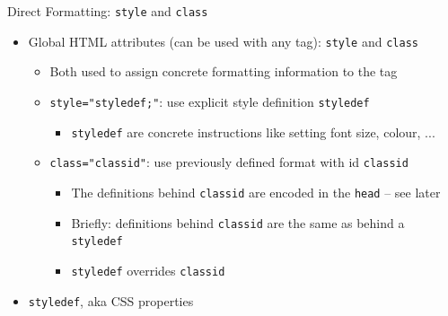 
\begin{frame}[fragile]{Direct Formatting: \texttt{style} and \texttt{class}}
%
\begin{itemize}
\item Global HTML attributes (can be used with any tag): \texttt{style} and \texttt{class}
	\begin{itemize}
	\item Both used to assign concrete formatting information to the tag
	\item \texttt{style="styledef;"}: use explicit style definition \texttt{styledef}
		\begin{itemize}
		\item \texttt{styledef} are concrete instructions like setting font size, colour, ...
		\end{itemize}
	\item \texttt{class="classid"}: use previously defined format with id \texttt{classid}
		\begin{itemize}
		\item The definitions behind \texttt{classid} are encoded in the \texttt{head} -- see later
		\item Briefly: definitions behind \texttt{classid} are the same as behind a \texttt{styledef}
		\item \texttt{styledef} overrides \texttt{classid}
		\end{itemize}
	\end{itemize}
\pause
\item \texttt{styledef}, aka CSS properties
\end{itemize}
%
\end{frame}


